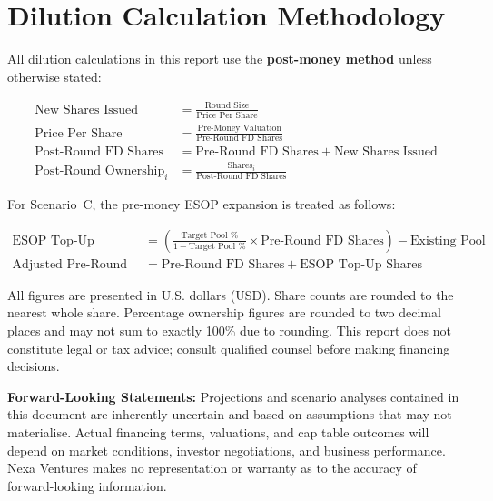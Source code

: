 \vspace{12pt}

\section{Dilution Calculation Methodology}

All dilution calculations in this report use the \textbf{post-money method} unless
otherwise stated:

\begin{align}
  \text{New Shares Issued} &= \frac{\text{Round Size}}{\text{Price Per Share}}\\[6pt]
  \text{Price Per Share} &= \frac{\text{Pre-Money Valuation}}{\text{Pre-Round FD Shares}}\\[6pt]
  \text{Post-Round FD Shares} &= \text{Pre-Round FD Shares} + \text{New Shares Issued}\\[6pt]
  \text{Post-Round Ownership}_i &= \frac{\text{Shares}_i}{\text{Post-Round FD Shares}}
\end{align}

For Scenario~C, the pre-money ESOP expansion is treated as follows:

\begin{align}
  \text{ESOP Top-Up Shares} &= \left(\frac{\text{Target Pool \%}}{1 - \text{Target Pool \%}} \times \text{Pre-Round FD Shares}\right) - \text{Existing Pool}\\[6pt]
  \text{Adjusted Pre-Round FD} &= \text{Pre-Round FD Shares} + \text{ESOP Top-Up Shares}
\end{align}

All figures are presented in U.S. dollars (USD). Share counts are rounded to the nearest
whole share. Percentage ownership figures are rounded to two decimal places and may not
sum to exactly 100\% due to rounding. This report does not constitute legal or tax advice;
consult qualified counsel before making financing decisions.

\vspace{10pt}

\begin{tcolorbox}[warnbox]
  \small
  \caution\textbf{Forward-Looking Statements:} Projections and scenario analyses contained
  in this document are inherently uncertain and based on assumptions that may not
  materialise. Actual financing terms, valuations, and cap table outcomes will depend on
  market conditions, investor negotiations, and business performance. Nexa Ventures makes
  no representation or warranty as to the accuracy of forward-looking information.
\end{tcolorbox}
